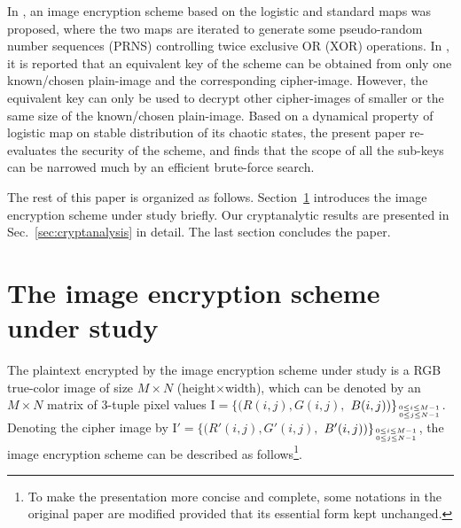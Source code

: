 \documentclass[twocolumn]{svjour3}
\newcommand\mymatrix[1]{\bm{\mathrm{#1}}}
\begin{document}
In \cite{Pareek:CNSNS2009}, an image encryption scheme based on the logistic and standard maps was proposed, where the two maps
are iterated to generate some pseudo-random number sequences (PRNS) controlling twice exclusive OR (XOR) operations. In \cite{Rhouma:BreakPareek:CNSNS10},
it is reported that an equivalent key of the scheme can be obtained from only one known/chosen plain-image and the corresponding cipher-image. However,
the equivalent key can only be used to decrypt other cipher-images of smaller or the same size of the known/chosen plain-image. Based on a dynamical property of logistic map on stable distribution of its chaotic states, the present paper re-evaluates the security of the
scheme, and finds that the scope of all the sub-keys can be narrowed much by an efficient brute-force search.

The rest of this paper is organized as follows. Section~\ref{sec:encryptscheme} introduces the image encryption
scheme under study briefly. Our cryptanalytic results are presented
in Sec.~\ref{sec:cryptanalysis} in detail. The last section
concludes the paper.

\section{The image encryption scheme under study}
\label{sec:encryptscheme}

The plaintext encrypted by the image encryption scheme under study
is a RGB true-color image of size $M\times N$ (height$\times$width),
which can be denoted by an $M\times N$ matrix of 3-tuple pixel
values $\mymatrix{I}=\{(R(i,j), G(i,j), $ $B(i,j))\}_{0\leq i\leq M-1 \atop
0\leq j\leq N-1}$. Denoting the cipher image by $\mymatrix{I}'=\{(R'(i,j),
G'(i,j),$ $ B'(i,j))\}_{0\leq i\leq M-1\atop 0\leq j\leq N-1}$, the
image encryption scheme can be described as follows\footnote{To make
the presentation more concise and complete, some notations in the
original paper are modified provided that its essential form kept unchanged.}.
\end{document}
